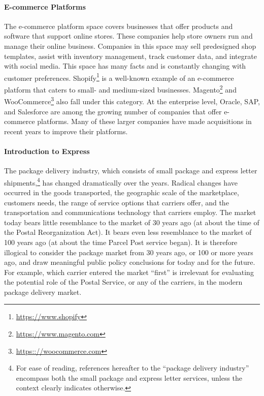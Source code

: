 \paragraph{E-commerce Platforms}
The e-commerce platform space covers businesses that offer products and software that support online stores. These companies help store owners run and manage their online business. Companies in this space may sell predesigned shop templates, assist with inventory management, track customer data, and integrate with social media. This space has many facts and is constantly changing with customer preferences.
Shopify\footnote{\url{https://www.shopify}} is a well-known example of an e-commerce platform that caters to small- and medium-sized businesses. Magento\footnote{\url{https://www.magento.com}} and WooCommerce\footnote{\url{https:://woocommerce.com}} also fall under this category. At the enterprise level, Oracle, SAP, and Salesforce are among the growing number of companies that offer e-commerce platforms. Many of these larger companies have made acquisitions in recent years to improve their platforms.

\paragraph{Introduction to Express}
The package delivery industry, which consists of small package and express letter shipments,\footnote{For ease of reading, references hereafter to the “package delivery industry” encompass both the small package and express letter services, unless the context clearly indicates otherwise.} has changed dramatically over the years. Radical changes have occurred in the goods transported, the geographic scale of the marketplace, customers needs, the range of service options that carriers offer, and the transportation and communications technology that carriers employ.  The market today bears little resemblance to the market of 30 years ago (at about the time of the Postal Reorganization Act). It bears even less resemblance to the market of 100 years ago (at about the time Parcel Post service began). It is therefore illogical to consider the package market from 30 years ago, or 100 or more years ago, and draw meaningful public policy conclusions for today and for the future. For example, which carrier entered the market “first” is irrelevant for evaluating the potential role of the Postal Service, or any of the carriers, in the modern package delivery market.

